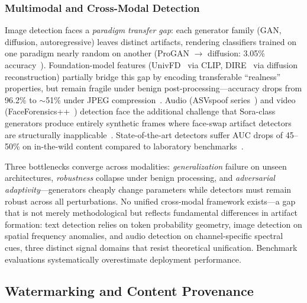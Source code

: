\subsubsection{Multimodal and Cross-Modal Detection}
\label{sec:detect-multimodal}

Image detection faces a \emph{paradigm transfer gap}: each generator family (GAN, diffusion, autoregressive) leaves distinct artifacts, rendering classifiers trained on one paradigm nearly random on another (ProGAN $\to$ diffusion: 3.05\% accuracy~\cite{ojha2023univfd}). Foundation-model features (UnivFD~\cite{ojha2023univfd} via CLIP, DIRE~\cite{wang2023dire} via diffusion reconstruction) partially bridge this gap by encoding transferable ``realness'' properties, but remain fragile under benign post-processing---accuracy drops from 96.2\% to $\sim$51\% under JPEG compression~\cite{zhu2023genimage}. Audio (ASVspoof series~\cite{asvspoof2019,asvspoof2021}) and video (FaceForensics++~\cite{rossler2019faceforensics}) detection face the additional challenge that Sora-class generators produce entirely synthetic frames where face-swap artifact detectors are structurally inapplicable~\cite{cai2024beyonddeepfake}. State-of-the-art detectors suffer AUC drops of 45--50\% on in-the-wild content compared to laboratory benchmarks~\cite{chandra2025deepfakeeval}.

Three bottlenecks converge across modalities: \emph{generalization} failure on unseen architectures, \emph{robustness} collapse under benign processing, and \emph{adversarial adaptivity}---generators cheaply change parameters while detectors must remain robust across all perturbations. No unified cross-modal framework exists---a gap that is not merely methodological but reflects fundamental differences in artifact formation: text detection relies on token probability geometry, image detection on spatial frequency anomalies, and audio detection on channel-specific spectral cues, three distinct signal domains that resist theoretical unification. Benchmark evaluations systematically overestimate deployment performance.




\subsection{Watermarking and Content Provenance}
\label{sec:watermark}

